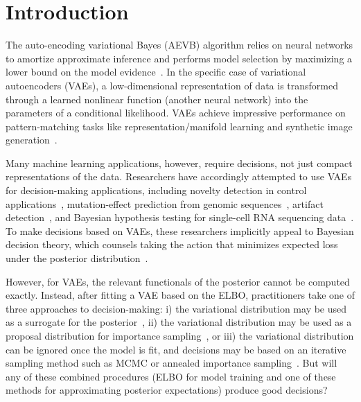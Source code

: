 \section{Introduction}

The auto-encoding variational Bayes (AEVB) algorithm relies on neural networks to amortize approximate inference and
performs model selection by maximizing a lower bound on the model evidence~\cite{AEVB, Rezende2014}. In the specific case of variational autoencoders (VAEs), a low-dimensional representation of data is transformed through a learned nonlinear function (another neural network) into the parameters of a conditional likelihood. VAEs achieve impressive performance on pattern-matching tasks like representation/manifold learning and synthetic image generation~\cite{Gulrajani2017}.

Many machine learning applications, however, require decisions, not just compact representations of the data. 
Researchers have accordingly attempted to use VAEs for decision-making applications, including novelty detection in control applications~\cite{Amini2018}, mutation-effect prediction from genomic sequences~\cite{Riesselman2018}, artifact detection~\cite{Ding2018}, and Bayesian hypothesis testing for single-cell RNA sequencing data~\cite{Lopez292037, Xu2019}.
To make decisions based on VAEs, these researchers implicitly appeal to Bayesian decision theory, which counsels taking the action that minimizes expected loss under the posterior distribution~\cite{Fienberg}.

However, for VAEs, the relevant functionals of the posterior cannot be computed exactly.
Instead, after fitting a VAE based on the ELBO, practitioners take one of three approaches to decision-making: i) the variational distribution may be used as a surrogate for the posterior~\cite{Riesselman2018}, ii) the variational distribution may be used as a proposal distribution for importance sampling~\cite{NIPS2018_7699}, or iii) the variational distribution can be ignored once the model is fit, and decisions may be based on an iterative sampling method such as MCMC or annealed importance sampling~\cite{wu2016quantitative}. But will any of these combined procedures (ELBO for model training and one of these methods for approximating posterior expectations) produce good decisions?

